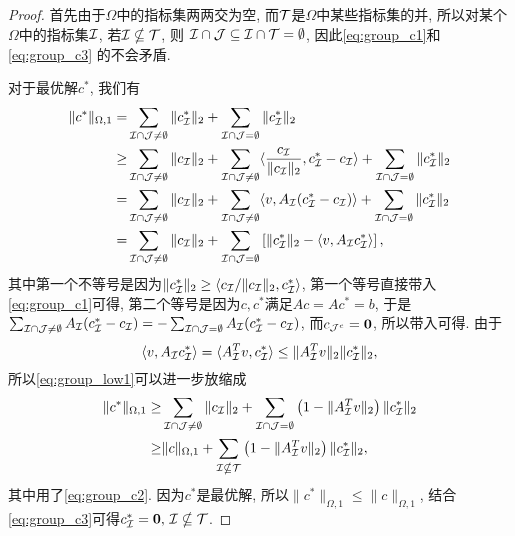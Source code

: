 \begin{proof}
  首先由于$\Omega$中的指标集两两交为空, 而$\mathcal{T}$是$\Omega$中某些指标集的并, 
  所以对某个$\Omega$中的指标集$\mathcal{I}$, 若$\mathcal{I} \nsubseteq \mathcal{T}$, 则
  $\mathcal{I} \cap \mathcal{J}\subseteq \mathcal{I} \cap \mathcal{T} =\emptyset $, 因此\eqref{eq:group_c1}和\eqref{eq:group_c3}
  的不会矛盾.

  对于最优解$c^*$, 我们有
  \begin{align}
    \|c^*\|_{\Omega, 1} =& \sum_{\mathcal{I} \cap \mathcal{J}\neq \emptyset}\|c^*_{\mathcal{I}}\|_2 +
    \sum_{\mathcal{I} \cap \mathcal{J} = \emptyset} \|c^*_{\mathcal{I}}\|_2 \nonumber \\
    \ge& \sum_{\mathcal{I} \cap \mathcal{J}\neq \emptyset}\|c_{\mathcal{I}}\|_2 + 
    \sum_{\mathcal{I} \cap \mathcal{J}\neq \emptyset}\langle \frac{c_{\mathcal{I}}}{\|c_{\mathcal{I}}\|_2} , c^*_{\mathcal{I}}-c_{\mathcal{I}}\rangle +
    \sum_{\mathcal{I} \cap \mathcal{J}=\emptyset}\|c^*_{\mathcal{I}}\|_2 \nonumber \\
    =& \sum_{\mathcal{I} \cap \mathcal{J}\neq \emptyset}\|c_{\mathcal{I}}\|_2 + 
    \sum_{\mathcal{I} \cap \mathcal{J}\neq \emptyset}\langle v, A_{\mathcal{I}}(c^*_{\mathcal{I}}-c_{\mathcal{I}})\rangle +
    \sum_{\mathcal{I} \cap \mathcal{J} =\emptyset}\|c^*_{\mathcal{I}}\|_2 \nonumber \\
    =& \sum_{\mathcal{I} \cap \mathcal{J}\neq \emptyset}\|c_{\mathcal{I}}\|_2 +
    \sum_{\mathcal{I} \cap \mathcal{J} = \emptyset} \left[\|c^*_{\mathcal{I}}\|_2 -
    \langle v, A_{\mathcal{I}} c^*_{\mathcal{I}}\rangle\right],\label{eq:group_low1}
  \end{align}
  其中第一个不等号是因为$\|c^*_{\mathcal{I}}\|_2 \ge \langle c_{\mathcal{I}}/\|c_{\mathcal{I}}\|_2,c^*_{\mathcal{I}}\rangle$,
  第一个等号直接带入\eqref{eq:group_c1}可得,
  第二个等号是因为$c,c^*$满足$Ac=Ac^*=b$, 于是$\sum_{\mathcal{I}\cap\mathcal{J} \neq
  \emptyset}A_{\mathcal{I}}(c_{\mathcal{I}}^*-c_{\mathcal{I}})=
  -\sum_{\mathcal{I} \cap\mathcal{J} =\emptyset} A_{\mathcal{I}}(c_{\mathcal{I}}^*-c_{\mathcal{I}})$,
  而$c_{\mathcal{J}^c}=\mathbf{0}$, 所以带入可得. 由于
  $$\langle v, A_{\mathcal{I}} c_{\mathcal{I}}^*\rangle = \langle A_{\mathcal{I}}^T v,
  c_{\mathcal{I}}^*\rangle \le \|A_{\mathcal{I}}^T v\|_2 \|c_{\mathcal{I}}^*\|_2,$$
  所以\eqref{eq:group_low1}可以进一步放缩成
  \begin{align}
    \|c^*\|_{\Omega, 1} \ge& \sum_{\mathcal{I} \cap \mathcal{J}\neq \emptyset}\|c_{\mathcal{I}}\|_2 +
    \sum_{\mathcal{I} \cap \mathcal{J} = \emptyset} \left(1-\|A_{\mathcal{I}}^T v\|_2\right)\|c^*_{\mathcal{I}}\|_2 \nonumber \\
    \ge& \|c\|_{\Omega, 1} + \sum_{\mathcal{I} \nsubseteq \mathcal{T}}\left(1-\|A_{\mathcal{I}}^T
    v\|_2\right)\|c^*_{\mathcal{I}}\|_2,
    \label{eq:group_low2}
  \end{align}
  其中用了\eqref{eq:group_c2}. 因为$c^*$是最优解,
  所以$\|c^*\|_{\Omega,1}\le \|c\|_{\Omega, 1}$,
  结合\eqref{eq:group_c3}可得$c^*_{\mathcal{I}} = \mathbf{0},\, \mathcal{I} \nsubseteq \mathcal{T}$.
\end{proof}

